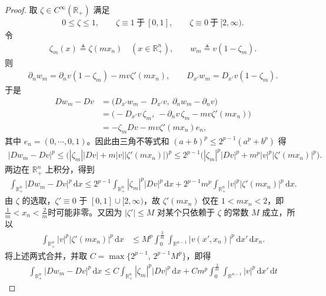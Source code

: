 \documentclass[../../main.tex]{subfiles}%
\begin{document}
\begin{proof}
取 $\zeta\in C^{\infty}(\mathbb{R}_{+})$ 满足
\begin{align*}
0\leqslant \zeta\leqslant 1,\qquad
\zeta\equiv 1\ \text{于}\ [0,1],\qquad
\zeta\equiv 0\ \text{于}\ [2,\infty).
\end{align*}
令
\begin{align*}
\zeta_{m}(x)\triangleq \zeta(mx_{n})\quad (x\in\mathbb{R}^{n}_{+}),\qquad
w_{m}\triangleq v(1-\zeta_{m}).
\end{align*}
则
\begin{align*}
\partial_{n}w_{m}=\partial_{n}v(1-\zeta_{m})-mv\zeta'(mx_{n}),\qquad
D_{x'}w_{m}=D_{x'}v(1-\zeta_{m}).
\end{align*}
于是
\begin{align*}
Dw_{m}-Dv
&=\big(D_{x'}w_{m}-\ D_{x'}v,\ \partial_{n}w_{m}-\partial_{n}v\big)\\
&=\big(-D_{x'}v\,\zeta_{m},\ -\partial_{n}v\,\zeta_{m}-m v\zeta'(mx_{n})\big)\\
&=-\zeta_{m}Dv - m v\zeta'(mx_{n})e_{n},
\end{align*}
其中 $e_{n}=(0,\cdots,0,1)$。因此由三角不等式和 $(a+b)^{p}\leqslant 2^{p-1}(a^{p}+b^{p})$ 得
\begin{align*}
|Dw_{m}-Dv|^{p}
\leqslant \big(|\zeta_{m}||Dv| + m|v||\zeta'(mx_{n})|\big)^{p}\leqslant 2^{p-1}\Big(|\zeta_{m}|^{p}|Dv|^{p} + m^{p}|v|^{p}|\zeta'(mx_{n})|^{p}\Big).
\end{align*}
两边在 $\mathbb{R}^{n}_{+}$ 上积分，得到
\begin{align*}
\int_{\mathbb{R}^{n}_{+}}|Dw_{m}-Dv|^{p}\,\mathrm{d}x
\leqslant 2^{p-1}\int_{\mathbb{R}^{n}_{+}}|\zeta_{m}|^{p}|Dv|^{p}\,\mathrm{d}x + 2^{p-1}m^{p}\int_{\mathbb{R}^{n}_{+}}|v|^{p}|\zeta'(mx_{n})|^{p}\,\mathrm{d}x.
\end{align*}
由 $\zeta$ 的选取，$\zeta'\equiv 0$ 于 $[0,1]\cup[2,\infty)$，故 $\zeta'(mx_{n})$ 仅在 $1< mx_{n}<2$，即$\frac{1}{m}< x_{n}<\frac{2}{m}$时可能非零。又因为 $|\zeta'|\leqslant M$ 对某个只依赖于 $\zeta$ 的常数 $M$ 成立，所以
\begin{align*}
\int_{\mathbb{R}^{n}_{+}}|v|^{p}|\zeta'(mx_{n})|^{p}\,\mathrm{d}x
&\leqslant M^{p}\int_{0}^{\frac{2}{m}}\int_{\mathbb{R}^{n-1}}|v(x',x_{n})|^{p}\,\mathrm{d}x'\,\mathrm{d}x_{n}.
\end{align*}
将上述两式合并，并取 $C=\max\{2^{p-1},\,2^{p-1}M^{p}\}$，即得
\begin{align}\label{eq:ch05-零迹-估计AB}
\int_{\mathbb{R}^{n}_{+}}|Dw_{m}-Dv|^{p}\,\mathrm{d}x
\leqslant C\int_{\mathbb{R}^{n}_{+}}|\zeta_{m}|^{p}|Dv|^{p}\,\mathrm{d}x
+Cm^{p}\int_{0}^{\frac{2}{m}}\int_{\mathbb{R}^{n-1}}|v|^{p}\,\mathrm{d}x'\,\mathrm{d}t

\end{align}
\end{proof}
\end{document}
